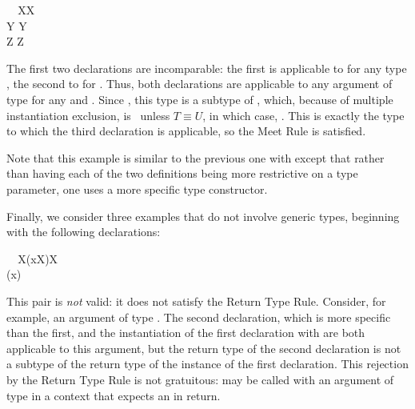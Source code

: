 \documentclass[10pt]{sigplanconf}
\newcommand{\Bottom}{\TYP{Bottom}}
\begin{document}
\small
\begin{FortressCode}
{\tt ~~}\+\llbracket{}X\rrbracket{}\llbracket{}X\rrbracket\COLON {} \\
  \llbracket{}Y \SHORTCUT{<} \rrbracket{}\llbracket{}Y\rrbracket\COLON {} \\
  \llbracket{}Z \SHORTCUT{<} \rrbracket{}\llbracket{}Z\rrbracket\COLON {}\-
\end{FortressCode}
\normalsize
The first two declarations are incomparable:
the first is applicable to  for any type ,
the second to  for .
Thus, both declarations are applicable to any argument 
of type  
for any  and .
Since , 
this type is a subtype of , 
which, because of multiple instantiation exclusion, 
is \Bottom\ unless $T \equiv U$,
in which case,
.
This is exactly the type to which the third declaration is applicable, 
so the Meet Rule is satisfied.

Note that this example is similar to the previous one with 
except that rather than having each of the two definitions 
being more restrictive on a type parameter, 
one uses a more specific type constructor.

Finally, 
we consider three examples that do not involve generic types,
beginning with the following declarations:

\small
\begin{FortressCode}
{\tt ~~}\+\llbracket{}X\rrbracket(x\COLON X)\COLON X \\
  (x\COLON {})\COLON {}\-
\end{FortressCode}
\normalsize
This pair is \emph{not} valid: 
it does not satisfy the Return Type Rule.
Consider, for example, 
an argument of type .
The second declaration, 
which is more specific than the first,
and the instantiation of the first declaration with 
are both applicable to this argument,
but the return type  of the second declaration 
is not a subtype of the return type  of the instance of the first declaration.
This rejection by the Return Type Rule is not gratuitous: 
 may be called with an argument of type  
in a context that expects an  in return.
\end{document}
